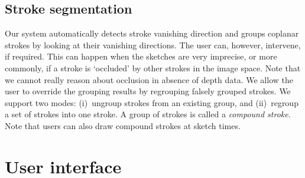



\subsection{Stroke segmentation}

Our system automatically detects stroke vanishing direction and groups coplanar strokes by looking at their vanishing directions. The user can, however, intervene, if required. This can happen when the sketches are very imprecise, or more commonly, if a stroke is `occluded' by other strokes in the image space. Note that we cannot really reason about occlusion in absence of depth data. We allow the user to override the grouping results by regrouping falsely grouped strokes. We support two modes: (i)~ungroup strokes from an existing group, and (ii)~regroup a set of strokes into one stroke. A group of strokes is called a \emph{compound stroke}. Note that users can also draw compound strokes at sketch times.

\section{User interface}
\label{sec:ui}

